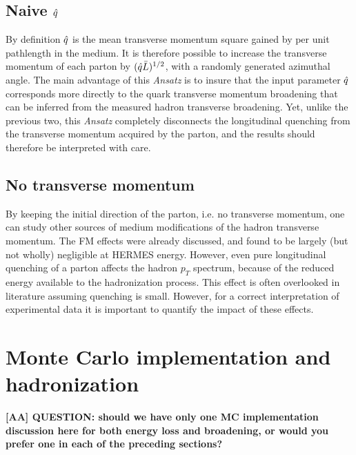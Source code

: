 \subsection{Naive ${\hat q}$}

By definition ${\hat q}$ is the mean transverse momentum square gained by per unit pathlength in the medium. It is therefore possible to increase the transverse momentum of each parton by $({\hat q} \bar L)^{1/2}$, with a randomly generated azimuthal angle. The main advantage of this {\it Ansatz} is to insure that the input parameter ${\hat q}$ corresponds more directly to the quark transverse momentum broadening that can be inferred from the measured hadron transverse broadening. Yet, unlike the previous two, this {\it Ansatz} completely disconnects the longitudinal quenching from the transverse momentum acquired by the parton, and the results should therefore be interpreted with care.


\subsection{No transverse momentum}

By keeping the initial direction of the parton, i.e. no transverse momentum, one can study other sources of medium modifications of the hadron transverse momentum. The FM effects were already discussed, and found to be largely (but not wholly) negligible at HERMES energy. However, even pure longitudinal quenching of a parton affects the hadron $p_T$ spectrum, because of the reduced energy available to the hadronization process. This effect is often overlooked in literature assuming quenching is small. However, for a correct interpretation of experimental data it is important to quantify the impact of these effects.


\section{Monte Carlo implementation and hadronization}
\label{sec:MC_implementation}

{\bf [AA] QUESTION: should we have only one MC implementation discussion here
for both energy loss and broadening, or would you prefer one in each of the preceding sections?}\\


